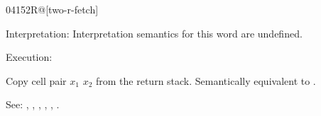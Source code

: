 \begin{newword*}{0415}{2R@}[two-r-fetch]
\item[Interpretation:]
	Interpretation semantics for this word are undefined.

\item[Execution:]

	Copy cell pair $x_1$ $x_2$ from the return stack.
	Semantically equivalent to   
	  .

\item[See:]
	,
	,
	,
	,
	,
	.
\end{newword*}


